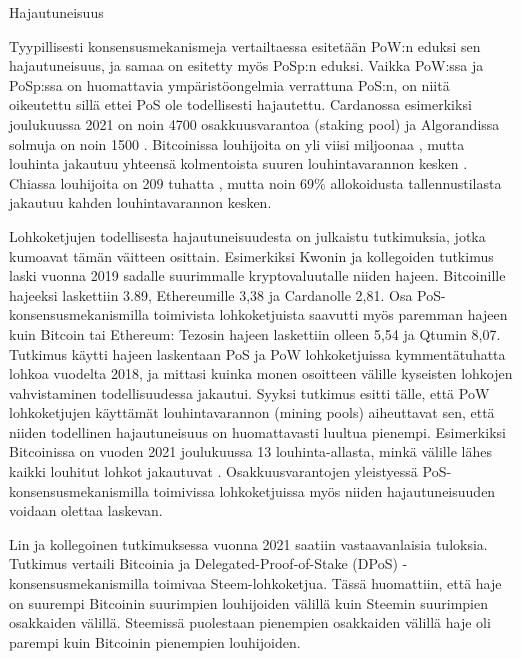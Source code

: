 \begin{section}{Hajautuneisuus\label{hajautuneisuus}}

Tyypillisesti konsensusmekanismeja vertailtaessa esitetään PoW:n eduksi sen hajautuneisuus, ja samaa on esitetty myös PoSp:n eduksi. Vaikka PoW:ssa ja PoSp:ssa on huomattavia ympäristöongelmia verrattuna PoS:n, on niitä oikeutettu sillä ettei PoS ole todellisesti hajautettu. Cardanossa esimerkiksi joulukuussa 2021 on noin 4700 osakkuusvarantoa (staking pool) \cite{cardano-staking-pools} ja Algorandissa solmuja on noin 1500 \cite{algorand-tps-nodes-etc}. Bitcoinissa louhijoita on yli viisi miljoonaa \cite{btc-pool-stats-miner-count}, mutta louhinta jakautuu yhteensä kolmentoista suuren louhintavarannon kesken \cite{btc-pool-stats}. Chiassa louhijoita on 209 tuhatta \cite{chia-pool-stats}, mutta noin 69\% allokoidusta tallennustilasta jakautuu kahden louhintavarannon kesken.

Lohkoketjujen todellisesta hajautuneisuudesta on julkaistu tutkimuksia, jotka kumoavat tämän väitteen osittain. Esimerkiksi Kwonin ja kollegoiden tutkimus \cite{decentr-impossibility} laski vuonna 2019 sadalle suurimmalle kryptovaluutalle niiden hajeen. Bitcoinille hajeeksi laskettiin 3.89, Ethereumille 3,38 ja Cardanolle 2,81. Osa PoS-konsensusmekanismilla toimivista lohkoketjuista saavutti myös paremman hajeen kuin Bitcoin tai Ethereum: Tezosin hajeen laskettiin olleen 5,54 ja Qtumin 8,07. Tutkimus käytti hajeen laskentaan PoS ja PoW lohkoketjuissa kymmentätuhatta lohkoa vuodelta 2018, ja mittasi kuinka monen osoitteen välille kyseisten lohkojen vahvistaminen todellisuudessa jakautui. Syyksi tutkimus esitti tälle, että PoW lohkoketjujen käyttämät louhintavarannon (mining pools) aiheuttavat sen, että niiden todellinen hajautuneisuus on huomattavasti luultua pienempi. Esimerkiksi Bitcoinissa on vuoden 2021 joulukuussa 13 louhinta-allasta, minkä välille lähes kaikki louhitut lohkot jakautuvat \cite{btc-pool-stats}. Osakkuusvarantojen yleistyessä PoS-konsensusmekanismilla toimivissa lohkoketjuissa myös niiden hajautuneisuuden voidaan olettaa laskevan.

Lin ja kollegoinen tutkimuksessa \cite{decentr-comparison-steem-pow} vuonna 2021 saatiin vastaavanlaisia tuloksia. Tutkimus vertaili Bitcoinia ja Delegated-Proof-of-Stake (DPoS) -konsensusmekanismilla toimivaa Steem-lohkoketjua. Tässä huomattiin, että haje on suurempi Bitcoinin suurimpien louhijoiden välillä kuin Steemin suurimpien osakkaiden välillä. Steemissä puolestaan pienempien osakkaiden välillä haje oli parempi kuin Bitcoinin pienempien louhijoiden.


\end{section}
